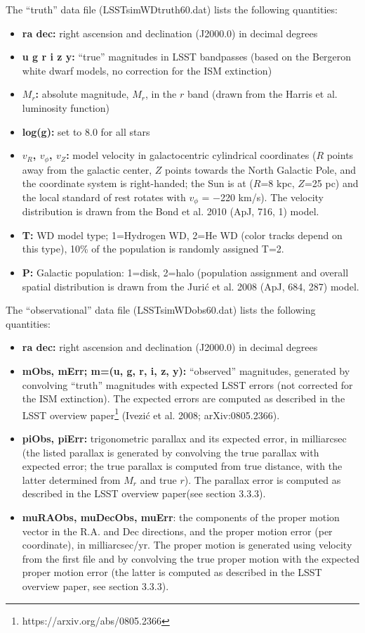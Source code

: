The “truth” data file (LSSTsimWDtruth60.dat) lists the following quantities:
\begin{itemize}
\item {\bf ra dec:} right ascension and declination (J2000.0)
 in decimal degrees 
\item {\bf u g r i z y:} ``true” magnitudes in LSST bandpasses (based on the
Bergeron white dwarf models, no correction for the ISM extinction)
\item {\bf $M_r$:} absolute magnitude, $M_r$, in the $r$ band (drawn from the 
    Harris et al. luminosity function)
\item {\bf log(g):} set to 8.0 for all stars
\item {\bf $v_R$, $v_\phi$, $v_Z$:} model velocity in galactocentric cylindrical coordinates 
($R$ points away from the galactic center, $Z$ points towards the North Galactic Pole, and 
the coordinate system is right-handed; the Sun is at ($R$=8 kpc, $Z$=25 pc) and the local 
standard of rest rotates with $v_\phi$ = $−$220 km/s). The velocity distribution is drawn 
from the Bond et al. 2010 (ApJ, 716, 1) model.
\item {\bf T:} WD model type; 1=Hydrogen WD, 2=He WD (color tracks depend on this type), 
10\% of the population is randomly assigned T=2.
\item {\bf P:} Galactic population: 1=disk, 2=halo (population assignment and overall spatial 
distribution is drawn from the Juri\'{c} et al. 2008 (ApJ, 684, 287) model.
\end{itemize}

The “observational” data file (LSSTsimWDobs60.dat) lists the following quantities:
\begin{itemize}
\item {\bf ra dec:} right ascension and declination (J2000.0)  in decimal degrees 
\item {\bf mObs, mErr; m=(u, g, r, i, z, y):} ``observed” magnitudes, generated by convolving 
“truth” magnitudes with expected LSST errors (not corrected for the ISM extinction). The expected 
errors are computed as described in the LSST overview paper\footnote{https://arxiv.org/abs/0805.2366} 
(Ivezi\'{c} et al. 2008; arXiv:0805.2366).
\item {\bf piObs, piErr:} trigonometric parallax and its expected error, in milliarcsec (the listed 
parallax is generated by convolving the true parallax with expected error; the true parallax is 
computed from true distance, with the latter determined from $M_r$ and true $r$). The parallax 
error is computed as described in the LSST overview paper(see section 3.3.3).
\item {\bf muRAObs, muDecObs, muErr}: the components of the proper motion vector in the 
R.A. and Dec directions, and the proper motion error (per coordinate), in milliarcsec/yr. The proper 
motion is generated using velocity from the first file and by convolving the true proper motion 
with the expected proper motion error (the latter is computed as described in the LSST 
overview paper, see section 3.3.3).
\end{itemize}


